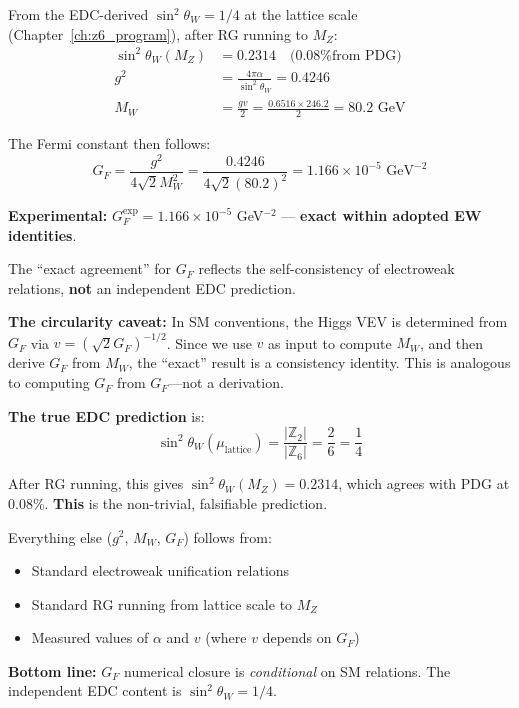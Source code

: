 \begin{theorem}
\label{thm:ch11_GF}
From the EDC-derived $\sin^2\theta_W = 1/4$ at the lattice scale
(Chapter~\ref{ch:z6_program}), after RG running to $M_Z$:
\begin{align}
    \sin^2\theta_W(M_Z) &= 0.2314 \quad \text{(0.08\% from PDG)} \\
    g^2 &= \frac{4\pi\alpha}{\sin^2\theta_W} = 0.4246 \\
    M_W &= \frac{gv}{2} = \frac{0.6516 \times 246.2}{2} = 80.2 \text{ GeV}
\end{align}

The Fermi constant then follows:
\begin{equation}
    \boxed{
    G_F = \frac{g^2}{4\sqrt{2}M_W^2} = \frac{0.4246}{4\sqrt{2}(80.2)^2}
    = 1.166 \times 10^{-5} \text{ GeV}^{-2}
    }
    \label{eq:ch11_GF_derived}
\end{equation}

\textbf{Experimental:} $G_F^{\text{exp}} = 1.166 \times 10^{-5}$ GeV$^{-2}$
\tagBL{} --- \textbf{exact within adopted EW identities}.
\end{theorem}

\begin{remark}
\label{rem:ch11_firewall}
The ``exact agreement'' for $G_F$ reflects the self-consistency of electroweak
relations, \textbf{not} an independent EDC prediction.

\textbf{The circularity caveat:} In SM conventions, the Higgs VEV is determined
from $G_F$ via $v = (\sqrt{2}G_F)^{-1/2}$. Since we use $v$ as input to compute
$M_W$, and then derive $G_F$ from $M_W$, the ``exact'' result is a consistency
identity. This is analogous to computing $G_F$ from $G_F$---not a derivation.

\textbf{The true EDC prediction} is:
\begin{equation}
    \sin^2\theta_W(\mu_{\text{lattice}}) = \frac{|\mathbb{Z}_2|}{|\mathbb{Z}_6|}
    = \frac{2}{6} = \frac{1}{4}
    \label{eq:ch11_sin2_input}
\end{equation}

After RG running, this gives $\sin^2\theta_W(M_Z) = 0.2314$, which agrees with
PDG at 0.08\%. \textbf{This} is the non-trivial, falsifiable prediction.

Everything else ($g^2$, $M_W$, $G_F$) follows from:
\begin{itemize}[nosep]
    \item Standard electroweak unification relations \tagBL{}
    \item Standard RG running from lattice scale to $M_Z$ \tagBL{}
    \item Measured values of $\alpha$ and $v$ (where $v$ depends on $G_F$) \tagBL{}
\end{itemize}

\textbf{Bottom line:} $G_F$ numerical closure is \emph{conditional} on SM
relations. The independent EDC content is $\sin^2\theta_W = 1/4$.
\end{remark}

